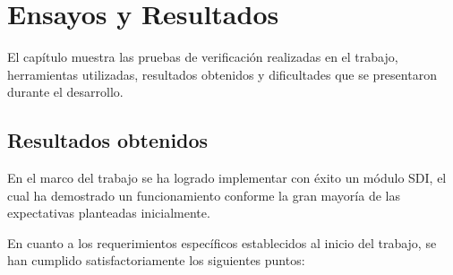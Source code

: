\chapter{Ensayos y Resultados}\label{Chapter4}

El capítulo muestra las pruebas de verificación realizadas en el trabajo,
herramientas utilizadas, resultados obtenidos y dificultades que se presentaron
durante el desarrollo.


\section{Resultados obtenidos}

  En el marco del trabajo se ha logrado implementar con éxito un módulo SDI,
  el cual ha demostrado un funcionamiento conforme la gran mayoría de
  las expectativas planteadas inicialmente.

  En cuanto a los requerimientos específicos establecidos al inicio del trabajo,
  se han cumplido satisfactoriamente los siguientes puntos:

